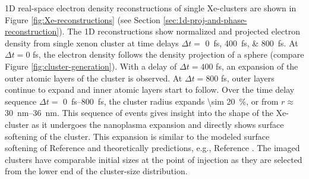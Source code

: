 1D real-space electron density reconstructions of single Xe-clusters are shown in Figure \ref{fig:Xe-reconstructions} (see Section \ref{sec:1d-proj-and-phase-reconstruction}). The 1D reconstructions show normalized and projected electron density from single xenon cluster at time delays $\Delta t=$ \SIlist{0;400;800}{\femto\second}. At $\Delta t = 0$ fs, the electron density follows the density projection of a sphere (compare Figure \ref{fig:cluster-generation}). With a delay of $\Delta t = 400$ fs, an expansion of the outer atomic layers of the cluster is observed. At $\Delta t = 800$ fs, outer layers continue to expand and inner atomic layers start to follow. Over the time delay sequence $\Delta t=$ \SIrange{0}{800}{\femto\second}, the cluster radius expands \SI{\sim 20}{\percent}, or from $r\approx$ \SIrange{30}{36}{\nano\meter}. This sequence of events gives insight into the shape of the Xe-cluster as it undergoes the nanoplasma expansion and directly shows surface softening of the cluster. This expansion is similar to the modeled surface softening of Reference \cite{Gorkhover-2016-NatPho} and theoretically predictions, e.g., Reference \citep{Hau-Riege-2004-PRE}. The imaged clusters have comparable initial sizes at the point of injection as they are selected from the lower end of the cluster-size distribution.\\[1\baselineskip]
